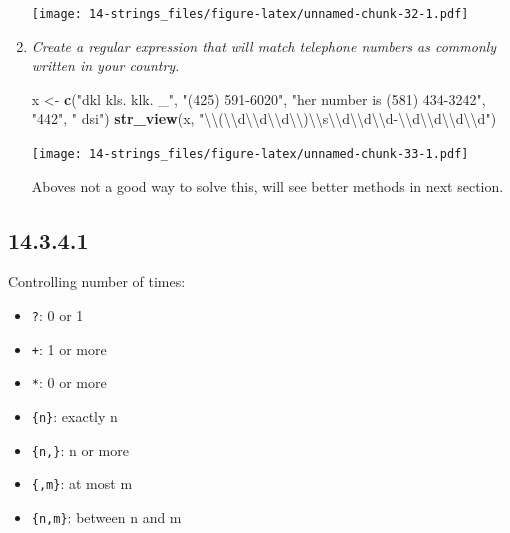 \documentclass[]{book}
\newenvironment{Shaded}{\begin{snugshade}}{\end{snugshade}}
\newcommand{\CharTok}[1]{\textcolor[rgb]{0.31,0.60,0.02}{#1}}
\newcommand{\KeywordTok}[1]{\textcolor[rgb]{0.13,0.29,0.53}{\textbf{#1}}}
\newcommand{\NormalTok}[1]{#1}
\newcommand{\StringTok}[1]{\textcolor[rgb]{0.31,0.60,0.02}{#1}}
\providecommand{\tightlist}{%
  \setlength{\itemsep}{0pt}\setlength{\parskip}{0pt}}
\theoremstyle{definition}
\theoremstyle{definition}
\theoremstyle{definition}
\theoremstyle{remark}
\begin{document}
\begin{enumerate}
  \texttt{[image: 14-strings\_files/figure-latex/unnamed-chunk-32-1.pdf]}
\item
  \emph{Create a regular expression that will match telephone numbers as
  commonly} \emph{written in your country.}

\begin{Shaded}
\begin{Highlighting}[]
\NormalTok{x <-}\StringTok{ }\KeywordTok{c}\NormalTok{(}\StringTok{"dkl kls. klk. _"}\NormalTok{, }\StringTok{"(425) 591-6020"}\NormalTok{, }\StringTok{"her number is (581) 434-3242"}\NormalTok{, }\StringTok{"442"}\NormalTok{, }\StringTok{"  dsi"}\NormalTok{)}
\KeywordTok{str_view}\NormalTok{(x, }\StringTok{"}\CharTok{\textbackslash{}\textbackslash{}}\StringTok{(}\CharTok{\textbackslash{}\textbackslash{}}\StringTok{d}\CharTok{\textbackslash{}\textbackslash{}}\StringTok{d}\CharTok{\textbackslash{}\textbackslash{}}\StringTok{d}\CharTok{\textbackslash{}\textbackslash{}}\StringTok{)}\CharTok{\textbackslash{}\textbackslash{}}\StringTok{s}\CharTok{\textbackslash{}\textbackslash{}}\StringTok{d}\CharTok{\textbackslash{}\textbackslash{}}\StringTok{d}\CharTok{\textbackslash{}\textbackslash{}}\StringTok{d-}\CharTok{\textbackslash{}\textbackslash{}}\StringTok{d}\CharTok{\textbackslash{}\textbackslash{}}\StringTok{d}\CharTok{\textbackslash{}\textbackslash{}}\StringTok{d}\CharTok{\textbackslash{}\textbackslash{}}\StringTok{d"}\NormalTok{)}
\end{Highlighting}
\end{Shaded}

  \texttt{[image: 14-strings\_files/figure-latex/unnamed-chunk-33-1.pdf]}

  Aboves not a good way to solve this, will see better methods in next
  section.
\end{enumerate}

\hypertarget{section-44}{%
\subsection{14.3.4.1}\label{section-44}}

Controlling number of times:

\begin{itemize}
\tightlist
\item
  \texttt{?}: 0 or 1
\item
  \texttt{+}: 1 or more
\item
  \texttt{*}: 0 or more
\item
  \texttt{\{n\}}: exactly n
\item
  \texttt{\{n,\}}: n or more
\item
  \texttt{\{,m\}}: at most m
\item
  \texttt{\{n,m\}}: between n and m
\end{itemize}
\end{document}
